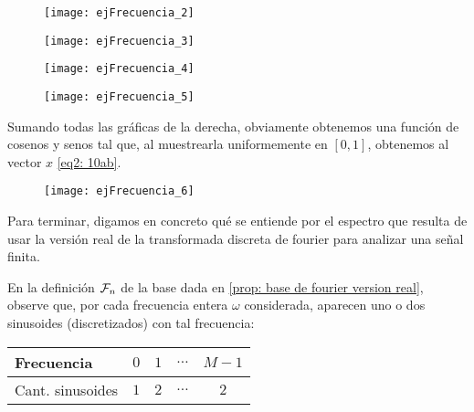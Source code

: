 \begin{ejemplo}
\begin{figure}[H]
	\centering
	\texttt{[image: ejFrecuencia\_2]} 
\end{figure}	

\begin{figure}[H]
	\centering
	\texttt{[image: ejFrecuencia\_3]} 
\end{figure}	

\begin{figure}[H]
	\centering
	\texttt{[image: ejFrecuencia\_4]} 
\end{figure}	


\begin{figure}[H]
	\centering
	\texttt{[image: ejFrecuencia\_5]} 
\end{figure}	

Sumando todas las gráficas de la derecha, obviamente
obtenemos una función de cosenos y senos tal que,
al muestrearla uniformemente en $[0,1]$, obtenemos
al vector $x$ \eqref{eq2: 10ab}.

\begin{figure}[H]
	\centering
	\texttt{[image: ejFrecuencia\_6]} 
\end{figure}	
\final
\end{ejemplo}

Para terminar, digamos en concreto qué se entiende
por el espectro que resulta de usar la 
versión real de la transformada
discreta de fourier para analizar una señal finita.

En la definición 
$\mathcal{F}_{n}$ de la base dada en 
\ref{prop: base de fourier version real}, observe que, 
por cada frecuencia entera $\omega$ considerada,
aparecen uno o dos sinusoides (discretizados) con tal frecuencia:


\begin{table}[ht]
\centering
  \begin{tabular}{ l | c | c | c | c }
    \hline
    Frecuencia & $0$ & $1$ & $\ldots$ & $M-1$  \\ \hline
    Cant. sinusoides  & $1$ & $2$ & $\ldots$ & $2$ \\
    \hline
  \end{tabular}
\label{Tab: frecuencias TDF n impar}
\end{table}

